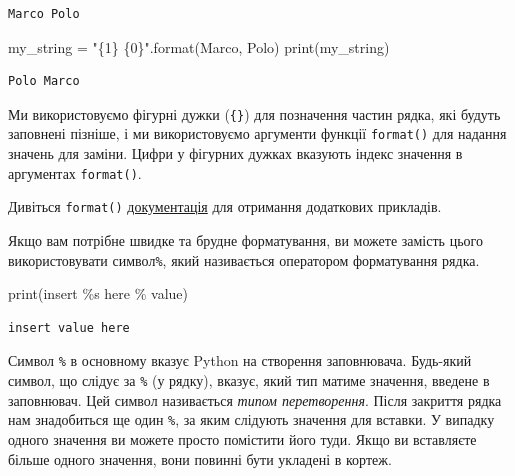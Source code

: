 \documentclass[
  letterpaper,
]{report}
\newenvironment{Shaded}{\begin{snugshade}}{\end{snugshade}}
\newcommand{\BuiltInTok}[1]{\textcolor[rgb]{0.00,0.23,0.31}{#1}}
\newcommand{\NormalTok}[1]{\textcolor[rgb]{0.00,0.23,0.31}{#1}}
\newcommand{\OperatorTok}[1]{\textcolor[rgb]{0.37,0.37,0.37}{#1}}
\newcommand{\SpecialCharTok}[1]{\textcolor[rgb]{0.37,0.37,0.37}{#1}}
\newcommand{\StringTok}[1]{\textcolor[rgb]{0.13,0.47,0.30}{#1}}
\begin{document}
\begin{verbatim}
Marco Polo
\end{verbatim}

\begin{Shaded}
\begin{Highlighting}[]
\NormalTok{my\_string }\OperatorTok{=} \StringTok{"}\SpecialCharTok{\{1\}}\StringTok{ }\SpecialCharTok{\{0\}}\StringTok{"}\NormalTok{.}\BuiltInTok{format}\NormalTok{(}\StringTok{\textquotesingle{}Marco\textquotesingle{}}\NormalTok{, }\StringTok{\textquotesingle{}Polo\textquotesingle{}}\NormalTok{)}
\BuiltInTok{print}\NormalTok{(my\_string)}
\end{Highlighting}
\end{Shaded}

\begin{verbatim}
Polo Marco
\end{verbatim}

Ми використовуємо фігурні дужки (\texttt{\{\}}) для позначення частин
рядка, які будуть заповнені пізніше, і ми використовуємо аргументи
функції \texttt{format()} для надання значень для заміни. Цифри у
фігурних дужках вказують індекс значення в аргументах \texttt{format()}.

Дивіться \texttt{format()}
\href{https://docs.python.org/3/library/string.html\#format-examples}{документація}
для отримання додаткових прикладів.

Якщо вам потрібне швидке та брудне форматування, ви можете замість цього
використовувати символ\texttt{\%}, який називається оператором
форматування рядка.

\begin{Shaded}
\begin{Highlighting}[]
\BuiltInTok{print}\NormalTok{(}\StringTok{\textquotesingle{}insert }\SpecialCharTok{\%s}\StringTok{ here\textquotesingle{}} \OperatorTok{\%} \StringTok{\textquotesingle{}value\textquotesingle{}}\NormalTok{)}
\end{Highlighting}
\end{Shaded}

\begin{verbatim}
insert value here
\end{verbatim}

Символ \texttt{\%} в основному вказує Python на створення заповнювача.
Будь-який символ, що слідує за \texttt{\%} (у рядку), вказує, який тип
матиме значення, введене в заповнювач. Цей символ називається
\emph{типом перетворення}. Після закриття рядка нам знадобиться ще один
\texttt{\%}, за яким слідують значення для вставки. У випадку одного
значення ви можете просто помістити його туди. Якщо ви вставляєте більше
одного значення, вони повинні бути укладені в кортеж.
\end{document}

